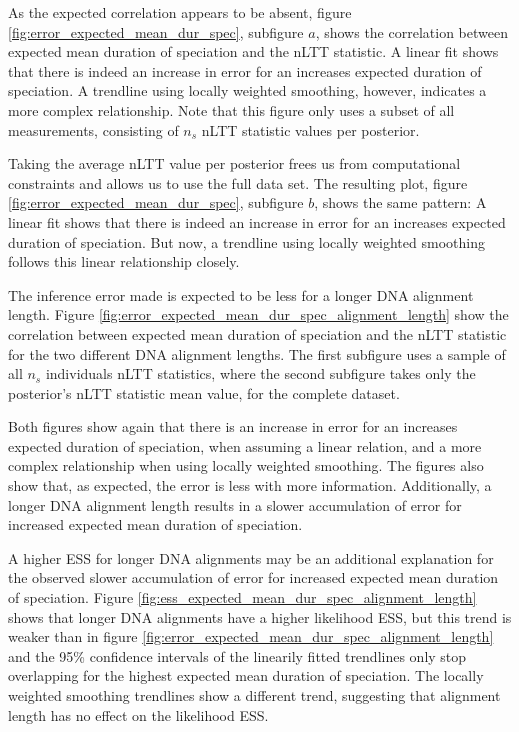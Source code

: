 \documentclass{article}
\begin{document}

As the expected correlation appears to be absent, figure 
\ref{fig:error_expected_mean_dur_spec}, subfigure $a$, 
shows the correlation between expected
mean duration of speciation and the nLTT statistic. A linear fit shows
that there is indeed an increase in error for an increases expected duration
of speciation. A trendline using locally weighted smoothing, however,
indicates a more complex relationship. Note that this figure only uses
a subset of all measurements, consisting of $n_s$ nLTT statistic values 
per posterior.

Taking the average nLTT value per posterior frees us from computational
constraints and allows us to use the full data set. The resulting
plot, figure \ref{fig:error_expected_mean_dur_spec}, subfigure $b$, shows the same pattern:
A linear fit shows
that there is indeed an increase in error for an increases expected duration
of speciation. But now, a trendline using locally weighted smoothing 
follows this linear relationship closely. 

The inference error made is expected to be less for a longer DNA
alignment length. 
Figure \ref{fig:error_expected_mean_dur_spec_alignment_length} 
show the correlation between expected mean duration of speciation 
and the nLTT statistic for the two different DNA alignment lengths. 
The first subfigure uses a sample of all $n_s$ individuals nLTT statistics,
where the second subfigure takes only the posterior's 
nLTT statistic mean value, for the complete dataset.

Both figures show again that there is an 
increase in error for an increases expected duration
of speciation, when assuming a linear relation, and
a more complex relationship when using locally weighted smoothing. 
The figures also show that, as expected, 
the error is less with more information. Additionally,
a longer DNA alignment length results in a slower accumulation of error
for increased expected mean duration of speciation.   

A higher ESS for longer DNA alignments may be an additional
explanation for the observed slower accumulation of error
for increased expected mean duration of speciation.
Figure \ref{fig:ess_expected_mean_dur_spec_alignment_length}
shows that longer DNA alignments have a higher likelihood ESS, 
but this trend is weaker than in figure 
\ref{fig:error_expected_mean_dur_spec_alignment_length} and
the 95\% confidence intervals of the linearily fitted trendlines only
stop overlapping for the highest expected mean duration of speciation.
The locally weighted smoothing trendlines show a different trend,
suggesting that alignment length has no effect on the
likelihood ESS.
\end{document}
